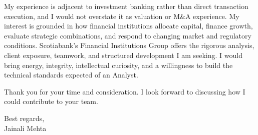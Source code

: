 \documentclass[letterpaper,11pt]{article}
\begin{document}
\bigbreak
My experience is adjacent to investment banking rather than direct transaction execution, and I would not overstate it as valuation or M\&A experience. My interest is grounded in how financial institutions allocate capital, finance growth, evaluate strategic combinations, and respond to changing market and regulatory conditions. Scotiabank's Financial Institutions Group offers the rigorous analysis, client exposure, teamwork, and structured development I am seeking. I would bring energy, integrity, intellectual curiosity, and a willingness to build the technical standards expected of an Analyst.

\bigbreak
Thank you for your time and consideration. I look forward to discussing how I could contribute to your team.

\bigbreak
Best regards,\\
Jainali Mehta
\end{document}
